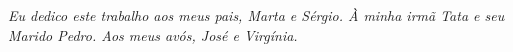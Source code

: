 \emph{Eu dedico este trabalho aos meus pais, Marta e Sérgio. À minha irmã Tata e seu Marido Pedro. Aos meus avós, José e Virgínia.
}
